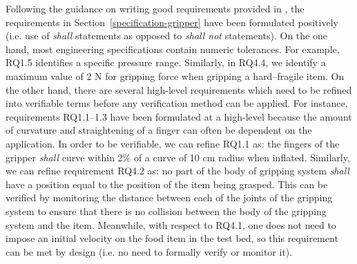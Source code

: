 \documentclass[lettersize,journal]{IEEEtran}
\begin{document}
Following the guidance on writing good requirements provided in \cite{NASA2007}, the requirements in Section~\ref{specification-gripper} have been formulated positively (i.e. use of \emph{shall} statements as opposed to \emph{shall not} statements). 
On the one hand, most engineering specifications contain numeric tolerances. 
For example, RQ1.5 identifies a specific pressure range. 
Similarly, in RQ4.4, we identify a maximum value of 2 N for gripping force when gripping a hard–fragile item. 
On the other hand, there are several high-level requirements which need to be refined into verifiable terms before any verification method can be applied. 
For instance, requirements RQ1.1--1.3 have been formulated at a high-level because the amount of curvature and straightening of a finger can often be dependent on the application. 
In order to be verifiable, we can refine RQ1.1 as: the fingers of the gripper \emph{shall} curve within 2\% of a curve of 10 cm radius when inflated. 
Similarly, we can refine requirement RQ4.2 as: no part of the body of gripping system \emph{shall} have a position equal to the position of the item being grasped. 
This can be verified by monitoring the distance between each of the joints of the gripping system to ensure that there is no collision between the body of the gripping system and the item. 
Meanwhile, with respect to RQ4.1, one does not need to impose an initial velocity on the food item in the test bed, so this requirement can be met by design (i.e. no need to formally verify or monitor it).
\end{document}
